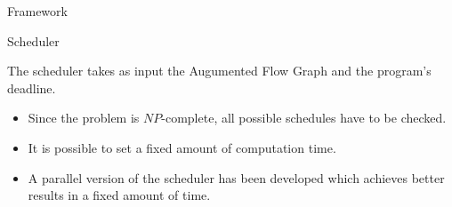 \documentclass[xcolor=dvipsnames]{beamer}
\begin{document}
\begin{section}{Framework}



\begin{frame}{\hskip 0.3cm Scheduler }

The scheduler takes as input the Augumented Flow Graph and the program's deadline.

\begin{itemize}

\item Since the problem is $NP$-complete, all possible schedules have to be checked.

\item It is possible to set a fixed amount of computation time.

\item A parallel version of the scheduler has been developed which achieves better results in a fixed amount of time.


\end{itemize}
\end{frame}
\end{section}
\end{document}
